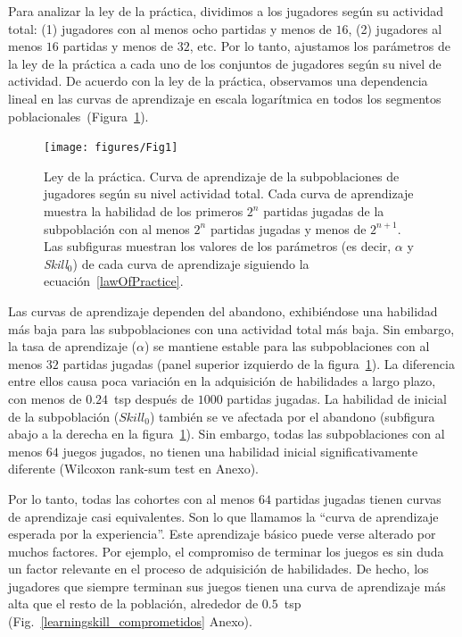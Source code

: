 \documentclass[a4paper,11pt]{book}
\theoremstyle{definition}
\begin{document}

Para analizar la ley de la pr\'actica, dividimos a los jugadores seg\'un su actividad total: (1) jugadores con al menos ocho partidas y menos de $16$, (2) jugadores al menos $16$ partidas y menos de $32$, etc.
%
Por lo tanto, ajustamos los par\'ametros de la ley de la pr\'actica a cada uno de los conjuntos de jugadores seg\'un su nivel de actividad.
%
De acuerdo con la ley de la pr\'actica, observamos una dependencia lineal en las curvas de aprendizaje en escala logar\'itmica en todos los segmentos poblacionales~(Figura~\ref{learningskill_curve}).

\begin{figure}[ht!]
\centering
\texttt{[image: figures/Fig1]}
\caption{Ley de la pr\'actica.
%
Curva de aprendizaje de la subpoblaciones de jugadores seg\'un su nivel actividad total.
%
Cada curva de aprendizaje muestra la habilidad de los primeros $2^n$ partidas jugadas de la subpoblaci\'on con al menos $2^n$ partidas jugadas y menos de $2^{n+1}$.
%
Las subfiguras muestran los valores de los par\'ametros (es decir, $\alpha$ y \emph{Skill}$_0$) de cada curva de aprendizaje siguiendo la ecuaci\'on~\eqref{lawOfPractice}.
}
\label{learningskill_curve}
\end{figure}

Las curvas de aprendizaje dependen del abandono, exhibi\'endose una habilidad m\'as baja para las subpoblaciones con una actividad total m\'as baja.
%
Sin embargo, la tasa de aprendizaje ($\alpha$) se mantiene estable para las subpoblaciones con al menos $32$ partidas jugadas (panel superior izquierdo de la figura~\ref{learningskill_curve}).
%
La diferencia entre ellos causa poca variaci\'on en la adquisici\'on de habilidades a largo plazo, con menos de $0.24$~tsp despu\'es de $1000$ partidas jugadas.
%
La habilidad de inicial de la subpoblaci\'on ($Skill_0$) tambi\'en se ve afectada por el abandono (subfigura abajo a la derecha en la figura~\ref{learningskill_curve}).
%
Sin embargo, todas las subpoblaciones con al menos $64$ juegos jugados, no tienen una habilidad inicial significativamente diferente (Wilcoxon rank-sum test en Anexo).


Por lo tanto, todas las cohortes con al menos $64$ partidas jugadas tienen curvas de aprendizaje casi equivalentes.
%
Son lo que llamamos la ``curva de aprendizaje esperada por la experiencia''.
%
Este aprendizaje b\'asico puede verse alterado por muchos factores.
%
Por ejemplo, el compromiso de terminar los juegos es sin duda un factor relevante en el proceso de adquisici\'on de habilidades.
%
De hecho, los jugadores que siempre terminan sus juegos tienen una curva de aprendizaje m\'as alta que el resto de la poblaci\'on, alrededor de $0.5$~tsp (Fig.~\ref{learningskill_comprometidos} Anexo).
\end{document}
